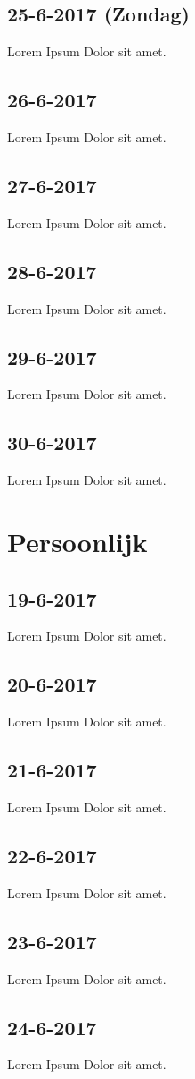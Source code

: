 \documentclass{uva-inf-article}
\begin{document}
\subsection{25-6-2017 (Zondag) }
Lorem Ipsum Dolor sit amet.
\subsection{26-6-2017}
Lorem Ipsum Dolor sit amet.
\subsection{27-6-2017}
Lorem Ipsum Dolor sit amet.
\subsection{28-6-2017}
Lorem Ipsum Dolor sit amet.
\subsection{29-6-2017}
Lorem Ipsum Dolor sit amet.
\subsection{30-6-2017}
Lorem Ipsum Dolor sit amet.

\section{Persoonlijk}
\subsection{19-6-2017}
Lorem Ipsum Dolor sit amet.
\subsection{20-6-2017}
Lorem Ipsum Dolor sit amet.
\subsection{21-6-2017}
Lorem Ipsum Dolor sit amet.
\subsection{22-6-2017}
Lorem Ipsum Dolor sit amet.
\subsection{23-6-2017}
Lorem Ipsum Dolor sit amet.
\subsection{24-6-2017}
Lorem Ipsum Dolor sit amet.
\end{document}
